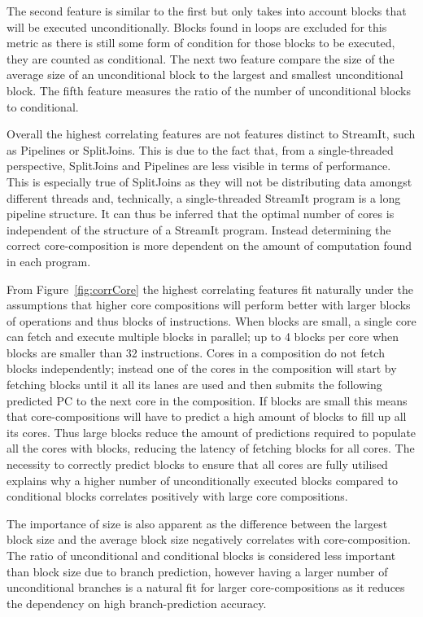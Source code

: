 The second feature is similar to the first but only takes into account blocks that will be executed unconditionally.
Blocks found in loops are excluded for this metric as there is still some form of condition for those blocks to be executed, they are counted as conditional.
The next two feature compare the size of the average size of an unconditional block to the largest and smallest unconditional block.
The fifth feature measures the ratio of the number of unconditional blocks to conditional.

Overall the highest correlating features are not features distinct to StreamIt, such as Pipelines or SplitJoins.
This is due to the fact that, from a single-threaded perspective, SplitJoins and Pipelines are less visible in terms of performance.
This is especially true of SplitJoins as they will not be distributing data amongst different threads and, technically, a single-threaded StreamIt program is a long pipeline structure.
It can thus be inferred that the optimal number of cores is independent of the structure of a StreamIt program.
Instead determining the correct core-composition is more dependent on the amount of computation found in each program.

From Figure~\ref{fig:corrCore} the highest correlating features fit naturally under the assumptions that higher core compositions will perform better with larger blocks of operations and thus blocks of instructions.
When blocks are small, a single core can fetch and execute multiple blocks in parallel; up to 4 blocks per core when blocks are smaller than 32 instructions.
Cores in a composition do not fetch blocks independently; instead one of the cores in the composition will start by fetching blocks until it all its lanes are used and then submits the following predicted PC to the next core in the composition.
If blocks are small this means that core-compositions will have to predict a high amount of blocks to fill up all its cores.
Thus large blocks reduce the amount of predictions required to populate all the cores with blocks, reducing the latency of fetching blocks for all cores.
The necessity to correctly predict blocks to ensure that all cores are fully utilised explains why a higher number of unconditionally executed blocks compared to conditional blocks correlates positively with large core compositions.

The importance of size is also apparent as the difference between the largest block size and the average block size negatively correlates with core-composition.
The ratio of unconditional and conditional blocks is considered less important than block size due to branch prediction, however having a larger number of unconditional branches is a natural fit for larger core-compositions as it reduces the dependency on high branch-prediction accuracy.


